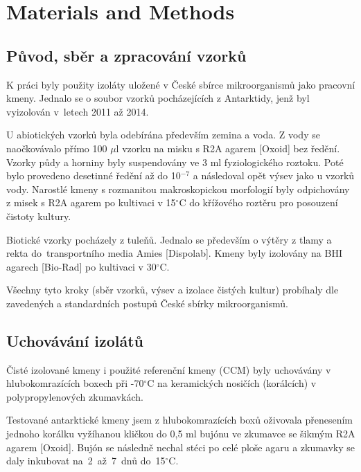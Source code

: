 \chapter{Materials and Methods}



\shorthandoff{-} 

\section{Původ, sběr a zpracování vzorků}
K práci byly použity izoláty uložené v České sbírce mikroorganismů jako pracovní kmeny.
Jednalo se o soubor vzorků pocházejících z Antarktidy, jenž byl vyizolován v~letech 2011 až 2014.

U abiotických vzorků byla odebírána především zemina a voda.
Z vody se naočkovávalo přímo 100 $\mu$l vzorku na misku s R2A agarem [Oxoid] bez ředění.
Vzorky půdy a horniny byly suspendovány ve 3 ml fyziologického roztoku.
Poté bylo provedeno desetinné ředění až do 10$^{-7}$ a následoval opět výsev jako u vzorků vody.
Narostlé kmeny s rozmanitou makroskopickou morfologií byly
odpichovány z misek s R2A agarem po kultivaci v 15$^\circ$C do křížového roztěru pro posouzení čistoty kultury.

Biotické vzorky pocházely z tuleňů.
Jednalo se především o výtěry z tlamy a rekta do~transportního media Amies [Dispolab].
Kmeny byly izolovány na BHI agarech [Bio-Rad] po kultivaci v 30$^\circ$C.

Všechny tyto kroky (sběr vzorků, výsev a izolace čistých kultur) probíhaly dle zavedených a standardních postupů České sbírky mikroorganismů.


\section{Uchovávání izolátů}
Čisté izolované kmeny i použité referenční kmeny (CCM) byly uchovávány v hlubokomrazících boxech při -70$^{\circ}$C na keramických nosičích (korálcích) v polypropylenových zkumavkách.

Testované antarktické kmeny jsem z hlubokomrazících boxů oživovala přenesením jednoho korálku vyžíhanou kličkou do 0,5 ml bujónu ve zkumavce se šikmým R2A agarem [Oxoid].
Bujón se následně nechal stéci po celé ploše agaru a zkumavky se daly inkubovat na~2~až~7~dnů do~15$^{\circ}$C.


